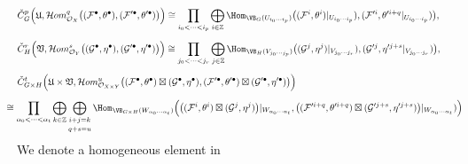 \begin{align*}
\begin{split}
&
\check{C}_{G}^p
\Big(
\mathfrak{U},
\mathcal{H}om_{\mathcal{O}_X}^q
\big(
(\mathcal{F}^{\bullet},\theta^{\bullet}),
(\mathcal{F}'^{\bullet},\theta'^{\bullet})
\big)
\Big)
\cong
\prod_{i_0<\cdots<i_p}
\bigoplus_{i\in\mathbb{Z}}
\Hom_{\VB_{G}(U_{i_0\cdots i_p})}
\big(
(\mathcal{F}^i,\theta^i)|_{U_{i_0\cdots i_p}}),
(\mathcal{F}'^i,\theta'^{i+q}|_{U_{i_0\cdots i_p}})
\big),
\\[2mm]
&
\check{C}_{H}^r
\Big(
\mathfrak{V},
\mathcal{H}om_{\mathcal{O}_Y}^s
\big(
(\mathcal{G}^{\bullet},\eta^{\bullet}),
(\mathcal{G}'^{\bullet},\eta'^{\bullet})
\big)
\Big)
\cong
\prod_{j_0<\cdots<j_r}
\bigoplus_{j\in\mathbb{Z}}
\Hom_{\VB_{H}(V_{j_0\cdots j_p})}
\big(
(\mathcal{G}^j,\eta^j)|_{V_{j_0\cdots j_r}}),
(\mathcal{G}'^j,\eta'^{j+s}|_{V_{j_0\cdots j_r}})
\big),
\\[2mm]
&
\check{C}_{G\times H}^t
\Big(
\mathfrak{U}\times\mathfrak{V},
\mathcal{H}om_{\mathcal{O}_{X\times Y}}^u
\big(
(\mathcal{F}^{\bullet},\theta^{\bullet})
\boxtimes
(\mathcal{G}^{\bullet},\eta^{\bullet}),
(\mathcal{F}'^{\bullet},\theta'^{\bullet})
\boxtimes
(\mathcal{G}'^{\bullet},\eta'^{\bullet})
\big)
\Big)
\\[2mm]
&
\hspace{-5mm}
\cong
\prod_{\alpha_0<\cdots<\alpha_t}
\bigoplus_{k\in\mathbb{Z}}
\bigoplus_{\substack{
i+j=k
\\[1mm]
q+s=u
}}
\Hom_{\VB_{G\times H}(W_{\alpha_0\cdots \alpha_t})}
\Big(
\big(
(\mathcal{F}^i,\theta^i)
\boxtimes
(\mathcal{G}^j,\eta^j)
\big)|_{W_{\alpha_0\cdots \alpha_t}},
\big(
(\mathcal{F}'^{i+q},\theta'^{i+q})
\boxtimes
(\mathcal{G}'^{j+s},\eta'^{j+s})
\big)|_{W_{\alpha_0\cdots \alpha_t}})
\Big)
\end{split}
\end{align*}
We denote a homogeneous element in
